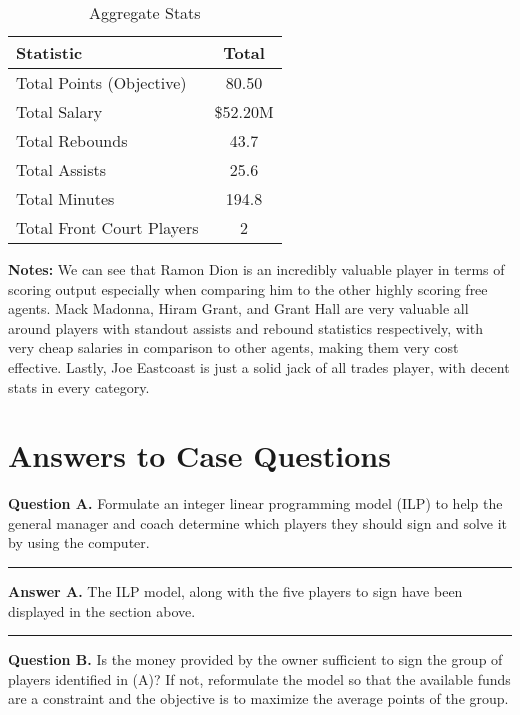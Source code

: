 \documentclass[a4paper,11pt]{article}
\newcommand{\vsp}{\vspace{0.5em}}
\newcommand{\ruler}{
    \vspace{1em}
    \hrule
    \vspace{1em}
}
\begin{document}
\begin{table}[h!]
    \centering
    \renewcommand{\arraystretch}{1.2} %
    \begin{tabular}{lc}
        \hline
        \textbf{Statistic}          & \textbf{Total} \\
        \hline
        Total Points (Objective)    & 80.50          \\
        Total Salary                & \$52.20M         \\
        Total Rebounds              & 43.7           \\
        Total Assists               & 25.6           \\
        Total Minutes               & 194.8          \\
        Total Front Court Players   & 2              \\
        \hline
    \end{tabular}
    \caption{Aggregate Stats}
    \label{tab:team_totals}
\end{table}

\textbf{Notes:} We can see that Ramon Dion is an incredibly valuable player in terms of scoring output especially when comparing him to the other highly scoring free agents. Mack Madonna, Hiram Grant, and Grant Hall are very valuable all around players with standout assists and rebound statistics respectively, with very cheap salaries in comparison to other agents, making them very cost effective. Lastly, Joe Eastcoast is just a solid jack of all trades player, with decent stats in every category.

\section{Answers to Case Questions}

\textbf{Question A.} 
Formulate an integer linear programming model (ILP) to help the general manager and coach determine which players they should sign and solve it by using the computer.

\ruler

\textbf{Answer A.} The ILP model, along with the five players to sign have been displayed in the section above.

\ruler

\vsp

\textbf{Question B.} 
Is the money provided by the owner sufficient to sign the group of players identified in (A)? If not, reformulate the model so that the available funds are a constraint and the objective is to maximize the average points of the group.
\end{document}
